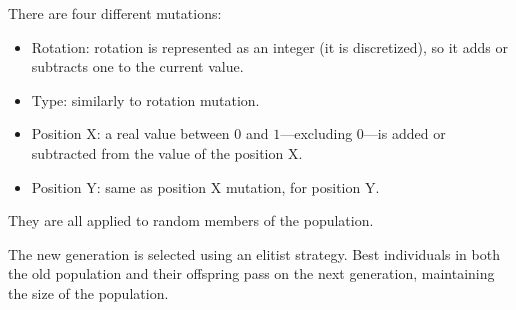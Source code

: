 \documentclass[sigconf]{acmart}
\begin{document}
There are four different mutations:

\begin{itemize}
	\item Rotation: rotation is represented as an integer (it is discretized), 
	so it adds or 
	subtracts one 
	to the current value. %
	\item Type: similarly to rotation mutation.
	\item Position X: a real value between $0$ and $1$---excluding $0$---is 
	added or subtracted from the value of the position X.
	\item Position Y: same as position X mutation, for position Y.
\end{itemize}

They are all applied to random members of the population.

The new generation is selected using an elitist strategy. Best individuals in 
both the old population and their offspring pass on the next generation, 
maintaining the size of the population.







\end{document}

